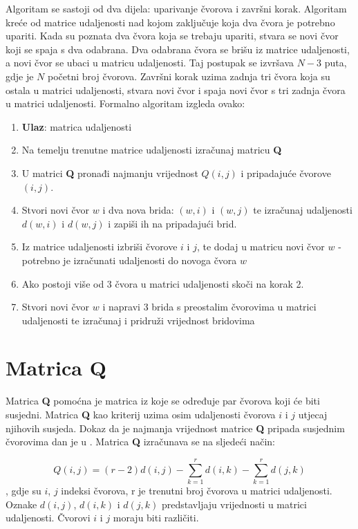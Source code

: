 \documentclass[times, utf8, seminar, numeric]{fer}
\begin{document}
Algoritam se sastoji od dva dijela: uparivanje čvorova i završni korak. Algoritam kreće od matrice udaljenosti nad kojom zaključuje koja dva čvora je potrebno upariti. Kada su poznata dva čvora koja se trebaju upariti, stvara se novi čvor koji se spaja s dva odabrana. Dva odabrana čvora se brišu iz matrice udaljenosti, a novi čvor se ubaci u matricu udaljenosti. Taj postupak se izvršava $N-3$ puta, gdje je $N$ početni broj čvorova. Završni korak uzima zadnja tri čvora koja su ostala u matrici udaljenosti, stvara novi čvor i spaja novi čvor s tri zadnja čvora u matrici udaljenosti. Formalno algoritam izgleda ovako:
\begin{enumerate}
	\item \textbf{Ulaz}: matrica udaljenosti
	\item Na temelju trenutne matrice udaljenosti izračunaj matricu \textbf{Q}
	\item U matrici \textbf{Q} pronađi najmanju vrijednost $Q(i,j)$ i pripadajuće čvorove $(i,j)$.
	\item Stvori novi čvor $w$ i dva nova brida: $(w,i)$ i $(w,j)$ te izračunaj udaljenosti $d(w,i)$ i $d(w,j)$ i zapiši ih na pripadajući brid.
	\item Iz matrice udaljenosti izbriši čvorove $i$ i $j$, te dodaj u matricu novi čvor $w$ - potrebno je izračunati udaljenosti do novoga čvora $w$
	\item Ako postoji više od 3 čvora u matrici udaljenosti skoči na korak 2.
	\item Stvori novi čvor $w$ i napravi 3 brida s preostalim čvorovima u matrici udaljenosti te izračunaj i pridruži vrijednost bridovima 
\end{enumerate}

\section{Matrica Q}
Matrica \textbf{Q} pomoćna je matrica iz koje se određuje par čvorova koji će biti susjedni. Matrica \textbf{Q} kao kriterij uzima osim udaljenosti čvorova $i$ i $j$ utjecaj njihovih susjeda. Dokaz da je najmanja vrijednost matrice \textbf{Q} pripada susjednim čvorovima dan je u \cite{saitou}. Matrica \textbf{Q} izračunava se na sljedeći način:

\begin{equation}
	Q(i,j) = (r-2) d(i,j) - \sum_{k=1}^{r}d(i,k) - \sum_{k=1}^{r}d(j,k)
\end{equation}
, gdje su $i$, $j$ indeksi čvorova, r je trenutni broj čvorova u matrici udaljenosti. Oznake $d(i,j)$, $d(i,k)$ i $d(j,k)$ predstavljaju vrijednosti u matrici udaljenosti. Čvorovi $i$ i $j$ moraju biti različiti.
\end{document}
